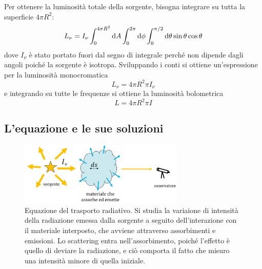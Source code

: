 Per ottenere la luminosità totale della sorgente, bisogna integrare su tutta la superficie $4\pi R^2$:
\[
    L_\nu = I_\nu \int_0^{4\pi R^2} \mathop{}\!\mathrm{d} A \int_0^{2\pi} \mathop{}\!\mathrm{d} \phi \int_0^{\pi/2} \mathop{}\!\mathrm{d} \theta \sin{\theta} \cos{\theta}
\]
dove $I_\nu$ è stato portato fuori dal segno di integrale perché non dipende dagli angoli poiché la sorgente è isotropa. Sviluppando i conti si ottiene un'espressione per la luminosità monocromatica
\begin{equation}\label{eq:luminosità-monocromatica-intensità}
    L_\nu = 4 \pi R^2 \pi I_\nu
\end{equation}
e integrando su tutte le frequenze si ottiene la luminosità bolometrica
\begin{equation}\label{eq:luminosità-intensità}
    L = 4 \pi R^2 \pi I
\end{equation}

\subsection{L'equazione e le sue soluzioni}\label{sec:trasporto-radiativo}\label{sec:soluzioni-trasporto-radiativo}

\begin{figure}
\centering
\includegraphics[width=0.7\textwidth]{immagini/trasporto-radiativo.png}
\caption{Equazione del trasporto radiativo. Si studia la variaione di intensità della radiazione emessa dalla sorgente a seguito dell'interazione con il materiale interposto, che avviene attraverso assorbimenti e emissioni. Lo scattering entra nell'assorbimento, poiché l'effetto è quello di deviare la radiazione, e ciò comporta il fatto che misuro una intensità minore di quella iniziale.}
\label{fig:trasporto-radiativo}
\end{figure}

